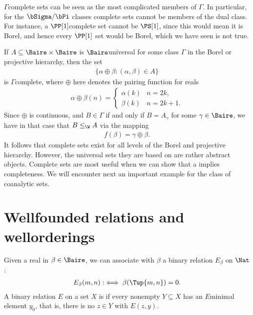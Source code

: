 \documentclass[letterpaper,10pt,english]{jupyterBook}
\begin{document}
\sphinxAtStartPar
\(\Gamma\)\sphinxhyphen{}complete sets can be seen as the most complicated members of \(\Gamma\). In particular, for the \(\bSigma/\bPi\) classes complete sets cannot be members of the dual class. For instance, a \(\PP[1]\)\sphinxhyphen{}complete set cannot be \(\PS[1]\), since this would mean it is Borel, and hence every \(\PP[1]\) set would be Borel, which we have seen is not true.

\sphinxAtStartPar
If \(A \subseteq \Baire \times \Baire\) is \(\Baire\)\sphinxhyphen{}universal for some class \(\Gamma\) in the Borel or projective hierarchy, then the set
\begin{equation*}
\begin{split}
	\{ \alpha \oplus \beta \colon (\alpha,\beta) \in A \}
\end{split}
\end{equation*}
\sphinxAtStartPar
is \(\Gamma\)\sphinxhyphen{}complete, where \(\oplus\) here denotes the pairing function for reals
\begin{equation*}
\begin{split}
	\alpha\oplus\beta(n) = \begin{cases}
	 	\alpha(k) & n = 2k, \\
		\beta(k) & n = 2k+1.
	\end{cases}
\end{split}
\end{equation*}
\sphinxAtStartPar
Since \(\oplus\) is continuous, and \(B \in \Gamma\) if and only if \(B = A_{\gamma}\) for some \(\gamma\in \Baire\), we have in that case that \(B \leq_{\W} A\) via the mapping
\begin{equation*}
\begin{split}
	f(\beta) = \gamma\oplus\beta.
\end{split}
\end{equation*}
\sphinxAtStartPar
It follows that complete sets exist for all levels of the Borel and projective hierarchy. However, the universal sets they are based on are rather abstract objects. Complete sets are most useful when we can show that a  implies completeness. We will encounter next an important example for the class of co\sphinxhyphen{}analytic sets.


\section{Well\sphinxhyphen{}founded relations and well\sphinxhyphen{}orderings}
\label{\detokenize{coanalytic:well-founded-relations-and-well-orderings}}\label{\detokenize{coanalytic:sec-well-founded}}
\sphinxAtStartPar
Given a real in \(\beta \in \Baire\), we can associate with \(\beta\) a binary relation \(E_\beta\) on \(\Nat\):
\begin{equation*}
\begin{split}
E_\beta(m,n) :\iff \beta(\Tup{m,n}) = 0.
\end{split}
\end{equation*}
\sphinxAtStartPar
A binary relation \(E\) on a set \(X\) is  if every non\sphinxhyphen{}empty \(Y \subseteq X\) has an \(E\)\sphinxhyphen{}minimal element \(y_0\), that is, there is no \(z \in Y\) with \(E(z,y)\).
\end{document}
